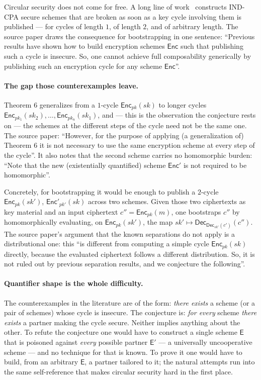 \documentclass{aicr-conjecture}
\newcommand{\Enc}{\mathsf{Enc}}
\newcommand{\Dec}{\mathsf{Dec}}
\begin{document}
Circular security does not come for free. A long line of
work~\cite{KRW15,KW16,AP16,GKW17a,GKW17b,HK17} constructs IND-CPA
secure schemes that are broken as soon as a key cycle involving them is
published --- for cycles of length $1$, of length $2$, and of arbitrary
length. The source paper draws the consequence for bootstrapping in one
sentence: ``Previous results have shown how to build encryption schemes
$\Enc$ such that publishing such a cycle is insecure. So, one cannot
achieve full composability generically by publishing such an encryption
cycle for any scheme $\Enc$''.

\paragraph{The gap those counterexamples leave.}
Theorem 6 generalizes from a $1$-cycle $\Enc_{pk}(sk)$ to longer cycles
$\Enc_{pk_{1}}(sk_{2}), \dots, \Enc_{pk_{n}}(sk_{1})$, and --- this is
the observation the conjecture rests on --- the schemes at the
different steps of the cycle need not be the same one. The source
paper: ``However, for the purpose of applying (a generalization of)
Theorem 6 it is not necessary to use the same encryption scheme at
every step of the cycle''. It also notes that the second scheme carries
no homomorphic burden: ``Note that the new (existentially quantified)
scheme $\Enc'$ is not required to be homomorphic''.

Concretely, for bootstrapping it would be enough to publish a $2$-cycle
$\Enc_{pk}(sk')$, $\Enc'_{pk'}(sk)$ across two schemes. Given those two
ciphertexts as key material and an input ciphertext
$c'' = \Enc_{pk}(m)$, one bootstraps $c''$ by homomorphically
evaluating, on $\Enc_{pk}(sk')$, the map $sk' \mapsto
\Dec_{\Dec_{sk'}(c')}(c'')$. The source paper's argument that the known
separations do not apply is a distributional one: this ``is different
from computing a simple cycle $\Enc_{pk}(sk)$ directly, because the
evaluated ciphertext follows a different distribution. So, it is not
ruled out by previous separation results, and we conjecture the
following''.

\paragraph{Quantifier shape is the whole difficulty.}
The counterexamples in the literature are of the form: \emph{there
exists} a scheme (or a pair of schemes) whose cycle is insecure. The
conjecture is: \emph{for every} scheme \emph{there exists} a partner
making the cycle secure. Neither implies anything about the other. To
refute the conjecture one would have to construct a single scheme
$\mathsf{E}$ that is poisoned against \emph{every} possible partner
$\mathsf{E}'$ --- a universally uncooperative scheme --- and no
technique for that is known. To prove it one would have to build, from
an arbitrary $\mathsf{E}$, a partner tailored to it; the natural
attempts run into the same self-reference that makes circular security
hard in the first place.
\end{document}
